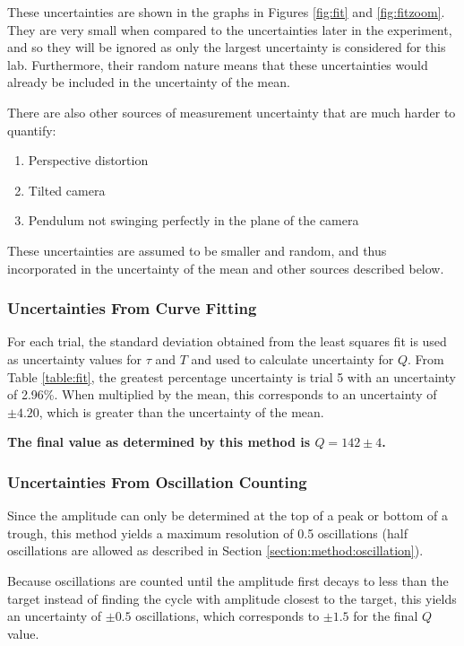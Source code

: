 \documentclass[aps,twocolumn,secnumarabic,nobalancelastpage,amsmath,amssymb,nofootinbib,letterpaper]{revtex4}
\begin{document}
These uncertainties are shown in the graphs in Figures \ref{fig:fit} and \ref{fig:fitzoom}. They are very small when
compared to the uncertainties later in the experiment, and so they will be ignored as only the largest uncertainty is
considered for this lab. Furthermore, their random nature means that these uncertainties would already be included in
the uncertainty of the mean.

There are also other sources of measurement uncertainty that are much harder to quantify:
\begin{enumerate}
    \item Perspective distortion
    \item Tilted camera
    \item Pendulum not swinging perfectly in the plane of the camera
\end{enumerate}
These uncertainties are assumed to be smaller and random, and thus incorporated in the uncertainty of the mean and other
sources described below.

\subsubsection{Uncertainties From Curve Fitting}

For each trial, the standard deviation obtained from the least squares fit is used as uncertainty values for \(\tau\)
and \(T\) and used to calculate uncertainty for \(Q\). From Table \ref{table:fit}, the greatest percentage uncertainty
is trial 5 with an uncertainty of 2.96\%. When multiplied by the mean, this corresponds to an uncertainty of
\(\pm 4.20\), which is greater than the uncertainty of the mean.

\textbf{The final value as determined by this method is \(Q = 142 \pm 4\).}

\subsubsection{Uncertainties From Oscillation Counting}

Since the amplitude can only be determined at the top of a peak or bottom of a trough, this method yields a maximum
resolution of 0.5 oscillations (half oscillations are allowed as described in Section \ref{section:method:oscillation}).

Because oscillations are counted until the amplitude first decays to less than the target instead of finding the cycle
with amplitude closest to the target, this yields an uncertainty of \(\pm 0.5\) oscillations, which corresponds to
\(\pm 1.5\) for the final \(Q\) value.
\end{document}
